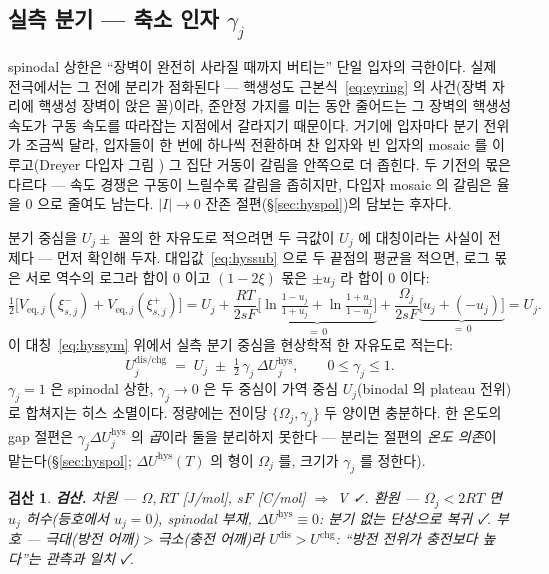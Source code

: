 \documentclass[11pt,a4paper]{article}
\newtheorem*{verifybox}{검산}
\newcommand{\eq}{\mathrm{eq}}
\newcommand{\dis}{\mathrm{dis}}
\newcommand{\chg}{\mathrm{chg}}
\newcommand{\hys}{\mathrm{hys}}
\begin{document}
\subsection{실측 분기 — 축소 인자 $\gamma_j$}
spinodal 상한은 ``장벽이 완전히 사라질 때까지 버티는'' 단일 입자의 극한이다. 실제 전극에서는 그 전에
분리가 점화된다 — 핵생성도 근본식~\eqref{eq:eyring} 의 사건(장벽 자리에 핵생성 장벽이 앉은 꼴)이라,
준안정 가지를 미는 동안 줄어드는 그 장벽의 핵생성 속도가 구동 속도를 따라잡는 지점에서 갈라지기 때문이다.
거기에 입자마다 분기 전위가 조금씩 달라, 입자들이 한 번에 하나씩 전환하며 찬 입자와 빈 입자의
mosaic 를 이루고(Dreyer 다입자 그림 \cite{dreyer2010}) 그 집단 거동이 갈림을 안쪽으로 더 좁힌다. 두 기전의 몫은 다르다 — 속도 경쟁은 구동이 느릴수록 갈림을 좁히지만, 다입자
mosaic 의 갈림은 율을 $0$ 으로 줄여도 남는다. $|I|\to0$ 잔존 절편(\S\ref{sec:hyspol})의 담보는
후자다.

분기 중심을 $U_j\pm$ 꼴의 한 자유도로 적으려면 두 극값이 $U_j$ 에 대칭이라는 사실이 전제다 — 먼저
확인해 두자. 대입값~\eqref{eq:hyssub} 으로 두 끝점의 평균을
적으면, 로그 몫은 서로 역수의 로그라 합이 $0$ 이고 $(1-2\xi)$ 몫은 $\pm u_j$ 라 합이 $0$ 이다:
\begin{equation}
\tfrac12\big[V_{\eq,j}(\xi_{s,j}^-)+V_{\eq,j}(\xi_{s,j}^+)\big]
=U_j+\frac{RT}{2sF}
\underbrace{\Big[\ln\tfrac{1-u_j}{1+u_j}+\ln\tfrac{1+u_j}{1-u_j}\Big]}_{=\,0}
+\frac{\Omega_j}{2sF}\underbrace{\big[u_j+(-u_j)\big]}_{=\,0}
=U_j.
\label{eq:hyssym}
\end{equation}
이 대칭~\eqref{eq:hyssym} 위에서 실측 분기 중심을 현상학적 한 자유도로 적는다:
\begin{equation}
U_j^{\dis/\chg}\;=\;U_j\;\pm\;\tfrac12\,\gamma_j\,\Delta U_j^\hys,
\qquad 0\le\gamma_j\le1.
\label{eq:hyscenter}
\end{equation}
$\gamma_j=1$ 은 spinodal 상한, $\gamma_j\to0$ 은 두 중심이 가역 중심 $U_j$(binodal 의 plateau 전위)로
합쳐지는 히스 소멸이다. 정량에는 전이당 $\{\Omega_j,\gamma_j\}$ 두 양이면 충분하다. 한 온도의 gap
절편은 $\gamma_j\Delta U_j^\hys$ 의 \emph{곱}이라 둘을 분리하지 못한다 — 분리는 절편의 \emph{온도
의존}이 맡는다(\S\ref{sec:hyspol}; $\Delta U^\hys(T)$ 의 형이 $\Omega_j$ 를, 크기가 $\gamma_j$ 를
정한다).

\begin{verifybox}
\textbf{검산.} 차원 — $\Omega,RT$ [J/mol], $sF$ [C/mol] $\Rightarrow$ V ✓. 환원 — $\Omega_j<2RT$ 면
$u_j$ 허수(등호에서 $u_j=0$), spinodal 부재, $\Delta U^\hys\equiv0$: 분기 없는 단상으로 복귀 ✓. 부호 — 극대(방전
어깨)$>$극소(충전 어깨)라 $U^{\dis}>U^{\chg}$: ``방전 전위가 충전보다 높다''는 관측과 일치 ✓.
\end{verifybox}
\end{document}
